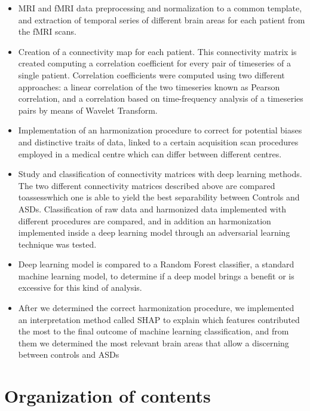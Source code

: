 \documentclass[10pt]{report}
\begin{document}
\begin{itemize}
\item MRI and fMRI data preprocessing and normalization to a common template, and extraction of temporal series of different brain areas for each patient from the fMRI scans.
\item Creation of a connectivity map for each patient. This connectivity matrix is created computing a correlation coefficient for every pair of timeseries of a single patient. Correlation coefficients were computed using two different approaches: a linear correlation of the two timeseries known as Pearson correlation, and a correlation based on time-frequency analysis of a timeseries pairs by means of Wavelet Transform.
\item Implementation of an harmonization procedure to correct for potential biases and distinctive traits of data, linked to a certain acquisition scan procedures employed in a medical centre which can differ between different centres.
\item Study and classification of connectivity matrices with deep learning methods. The two different connectivity matrices described above are compared toassesswhich one is able to yield the best separability between Controls and ASDs.
Classification of raw data and harmonized data implemented with different procedures are compared, and in addition an harmonization implemented inside a deep learning model through an adversarial learning technique was tested.
\item Deep learning model is compared to a Random Forest classifier, a standard machine learning model, to determine if a deep model brings a benefit or is excessive for this kind of analysis.
\item After we determined the correct harmonization procedure, we implemented an interpretation method called SHAP to explain which features contributed the most to the final outcome of machine learning classification, and from them we determined the most relevant brain areas that allow a discerning between controls and ASDs
\end{itemize}

\chapter*{Organization of contents}
\end{document}
